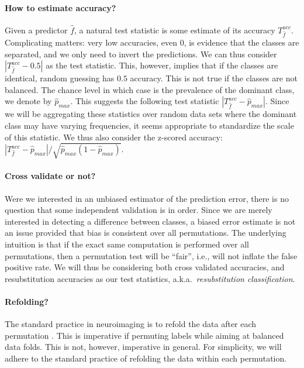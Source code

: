 \documentclass[12pt,a4paper]{article}
\newcommand{\hyp}{f} %
\newcommand{\hypEstim}{\hat{\hyp}} %
\newcommand{\acc}{T^{acc}}
\newcommand{\dominant}{\hat{p}_{max}}
\begin{document}
\paragraph{How to estimate accuracy?}
\label{sec:estimate_accuracy}
Given a predictor $\hypEstim$, a natural test statistic is some estimate of its accuracy $\acc_{\hypEstim}$.
Complicating matters: very low accuracies, even $0$, is evidence that the classes are separated, and we only need to invert the predictions. 
We can thus consider $|\acc_{\hypEstim}-0.5|$ as the test statistic.
This, however, implies that if the classes are identical, random guessing has $0.5$ accuracy. This is not true if the classes are not balanced. 
The chance level in which case is the prevalence of the dominant class, we denote by $\dominant$.
This suggests the following test statistic $|\acc_{\hypEstim}-\dominant|$.
Since we will be aggregating these statistics over random data sets where the dominant class may have varying frequencies, it seems appropriate to standardize the scale of this statistic. 
We thus also consider the z-scored accuracy: $|\acc_{\hypEstim}-\dominant|/\sqrt{\dominant(1-\dominant)}$.


\paragraph{Cross validate or not?}
Were we interested in an unbiased estimator of the prediction error, there is no question that some independent validation is in order. 
Since we are merely interested in detecting a difference between classes, a biased error estimate is not an issue provided that bias is consistent over all permutations. 
The underlying intuition is that if the exact same computation is performed over all permutations, then a permutation test will be ``fair'', i.e., will not inflate the false positive rate. 
We will thus be considering both cross validated accuracies, and resubstitution accuracies as our test statistics, a.k.a.\ \emph{resubstitution classification}. 


\paragraph{Refolding?}
The standard practice in neuroimaging is to refold the data after each permutation \citep{pereira_machine_2009}.
This is imperative if permuting labels while aiming at balanced data folds. 
This is not, however, imperative in general. 
For simplicity, we will adhere to the standard practice of refolding the data within each permutation.
\end{document}
